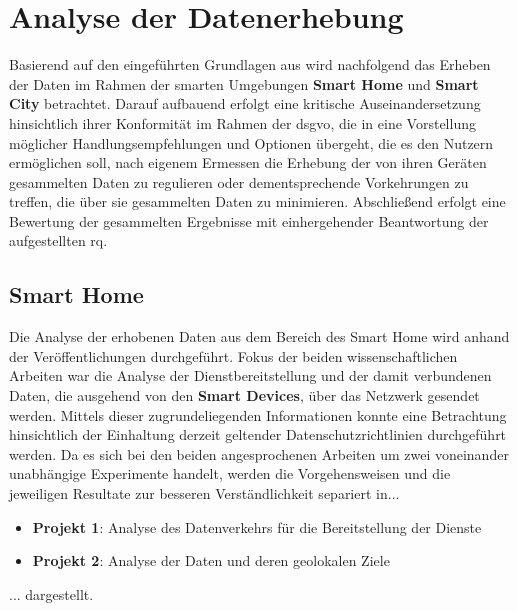 
\section{Analyse der Datenerhebung}
\label{sec:Analyse der Datenerhebung}

Basierend auf den eingeführten Grundlagen aus  wird nachfolgend das Erheben der Daten im Rahmen der smarten Umgebungen \textbf{Smart Home} und \textbf{Smart City} betrachtet. Darauf aufbauend erfolgt eine kritische Auseinandersetzung hinsichtlich ihrer Konformität im Rahmen der \ac{dsgvo}, die in eine Vorstellung möglicher Handlungsempfehlungen und Optionen übergeht, die es den Nutzern ermöglichen soll, nach eigenem Ermessen die Erhebung der von ihren Geräten gesammelten Daten zu regulieren oder dementsprechende Vorkehrungen zu treffen, die über sie gesammelten Daten zu minimieren. Abschließend erfolgt eine Bewertung der gesammelten Ergebnisse mit einhergehender Beantwortung der aufgestellten \acl{rq}.

\subsection{Smart Home}
\label{sec:Analyse der Datenerhebung:ssec:Smart Home}

Die Analyse der erhobenen Daten aus dem Bereich des Smart Home wird anhand der Veröffentlichungen \cite{Mandalari2021,Ren2019} durchgeführt. Fokus der beiden wissenschaftlichen Arbeiten war die Analyse der Dienstbereitstellung und der damit verbundenen Daten, die ausgehend von den \textbf{Smart Devices}, über das Netzwerk gesendet werden. Mittels dieser zugrundeliegenden Informationen konnte eine Betrachtung hinsichtlich der Einhaltung derzeit geltender Datenschutzrichtlinien durchgeführt werden.
Da es sich bei den beiden angesprochenen Arbeiten um zwei voneinander unabhängige Experimente handelt, werden die Vorgehensweisen und die jeweiligen Resultate zur besseren Verständlichkeit separiert in...
\begin{itemize}
	\item \textbf{Projekt 1}: Analyse des Datenverkehrs für die Bereitstellung der Dienste
	\item \textbf{Projekt 2}: Analyse der Daten und deren geolokalen Ziele
\end{itemize}
\noindent ... dargestellt.

